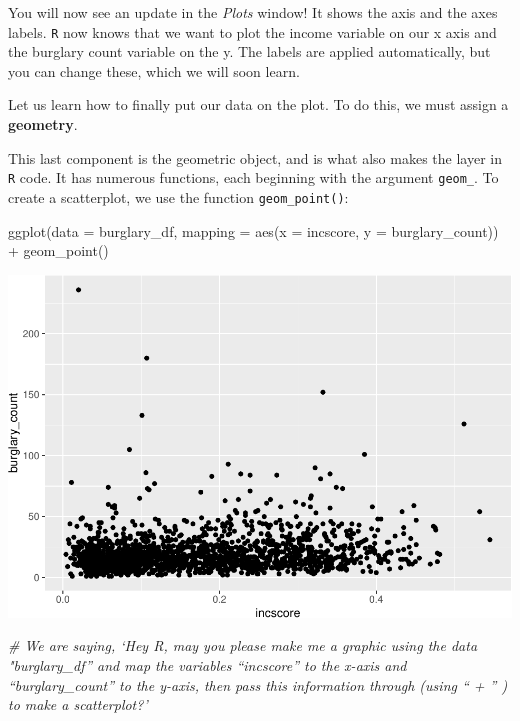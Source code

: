 \documentclass[
]{book}
\newenvironment{Shaded}{\begin{snugshade}}{\end{snugshade}}
\newcommand{\AttributeTok}[1]{\textcolor[rgb]{0.77,0.63,0.00}{#1}}
\newcommand{\CommentTok}[1]{\textcolor[rgb]{0.56,0.35,0.01}{\textit{#1}}}
\newcommand{\FunctionTok}[1]{\textcolor[rgb]{0.00,0.00,0.00}{#1}}
\newcommand{\NormalTok}[1]{#1}
\newcommand{\SpecialCharTok}[1]{\textcolor[rgb]{0.00,0.00,0.00}{#1}}
\begin{document}
You will now see an update in the \emph{Plots} window! It shows the axis and the axes labels. \texttt{R} now knows that we want to plot the income variable on our x axis and the burglary count variable on the y. The labels are applied automatically, but you can change these, which we will soon learn.

Let us learn how to finally put our data on the plot. To do this, we must assign a \textbf{geometry}.

This last component is the geometric object, and is what also makes the layer in \texttt{R} code. It has numerous functions, each beginning with the argument \texttt{geom\_}. To create a scatterplot, we use the function \texttt{geom\_point()}:

\begin{Shaded}
\begin{Highlighting}[]
\FunctionTok{ggplot}\NormalTok{(}\AttributeTok{data =}\NormalTok{ burglary\_df, }\AttributeTok{mapping =} \FunctionTok{aes}\NormalTok{(}\AttributeTok{x =}\NormalTok{ incscore, }\AttributeTok{y =}\NormalTok{ burglary\_count)) }\SpecialCharTok{+}
  \FunctionTok{geom\_point}\NormalTok{()}
\end{Highlighting}
\end{Shaded}

\includegraphics{03-data-visualisation_files/figure-latex/unnamed-chunk-6-1.pdf}

\begin{Shaded}
\begin{Highlighting}[]
\CommentTok{\# We are saying, ‘Hey R, may you please make me a graphic using the data "burglary\_df” and map the variables “incscore” to the x{-}axis and “burglary\_count” to the y{-}axis, then pass this information through (using “ + ” ) to make a scatterplot?’}
\end{Highlighting}
\end{Shaded}
\end{document}
